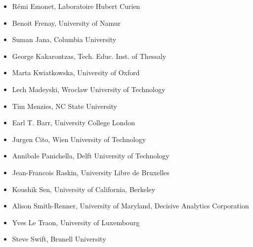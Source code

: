 \begin{itemize}[topsep=0.5em, itemsep=0.5em]
	\item Rémi Emonet, Laboratoire Hubert Curien
	\item Benoit Frenay, University of Namur
	\item Suman Jana, Columbia University
    \item George Kakarontzas, Tech. Educ. Inst. of Thessaly
	\item Marta Kwiatkowska, University of Oxford
	\item Lech Madeyski, Wroclaw University of Technology
	\item Tim Menzies, NC State University
	\item Earl T. Barr, University College London
	\item Jurgen Cito, Wien University of Technology
	\item Annibale Panichella, Delft University of Technology
	\item Jean-Francois Raskin, University Libre de Bruxelles
	\item Koushik Sen, University of California, Berkeley
	\item Alison Smith-Renner, University of Maryland, Decisive Analytics Corporation 
	\item Yves Le Traon, University of Luxembourg
	\item Steve Swift, Brunell University
\end{itemize}
